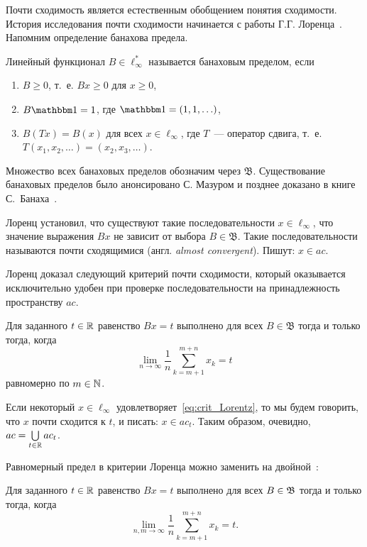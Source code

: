 Почти сходимость является естественным обобщением понятия сходимости.
История исследования почти сходимости начинается с работы Г.Г. Лоренца~\cite{lorentz1948contribution}.
Напомним определение банахова предела.

\begin{definition}
	\label{def:Banach_limit}
	Линейный функционал $B\in \ell_\infty^*$ называется банаховым пределом,
	если
	\begin{enumerate}
		\item
			$B\geq0$, т.~е. $Bx \geq 0$ для $x \geq 0$,
		\item
			$B\one=1$, где $\one =(1,1,\ldots)$,
		\item
			$B(Tx)=B(x)$ для всех $x\in \ell_\infty$, где $T$~---
		оператор сдвига, т.~е. $T(x_1,x_2,\ldots)=(x_2,x_3,\ldots)$.
	\end{enumerate}
\end{definition}
Множество всех банаховых пределов обозначим через $\mathfrak{B}$.
Существование банаховых пределов было анонсировано С. Мазуром \cite{Mazur} и позднее доказано в книге С.~Банаха~\cite{B}.


Лоренц установил, что существуют такие последовательности $x\in\ell_\infty$,
что значение выражения $Bx$ не зависит от выбора $B\in\mathfrak{B}$.
Такие последовательности называются почти сходящимися (англ. \textit{almost convergent}).
Пишут: $x\in ac$.

Лоренц доказал следующий критерий почти сходимости,
который оказывается исключительно удобен при проверке последовательности на принадлежность пространству $ac$.

\begin{theorem}
	Для заданного $t\in\mathbb{R}$ равенство $Bx=t$ выполнено для всех $B\in\mathfrak{B}$
	тогда и только тогда, когда
	\begin{equation}
		\label{eq:crit_Lorentz}
		\lim_{n\to\infty} \frac{1}{n} \sum_{k=m+1}^{m+n} x_k = t
	\end{equation}
	равномерно по $m\in\mathbb{N}$.
\end{theorem}

Если некоторый $x\in\ell_\infty$ удовлетворяет~\eqref{eq:crit_Lorentz},
то мы будем говорить, что $x$ почти сходится к $t$,
и писать: $x\in ac_t$.
Таким образом, очевидно, $ac = \bigcup\limits_{t\in\mathbb{R}} ac_t$.

Равномерный предел в критерии Лоренца можно заменить на двойной~\cite[Теорема 1]{zvol2022ac}:
\begin{theorem}
	Для заданного $t\in\mathbb{R}$ равенство $Bx=t$ выполнено для всех $B\in\mathfrak{B}$
	тогда и только тогда, когда
	\begin{equation}
		\label{eq:crit_Lorentz}
		\lim_{n,m\to\infty} \frac{1}{n} \sum_{k=m+1}^{m+n} x_k = t
		.
	\end{equation}
\end{theorem}

